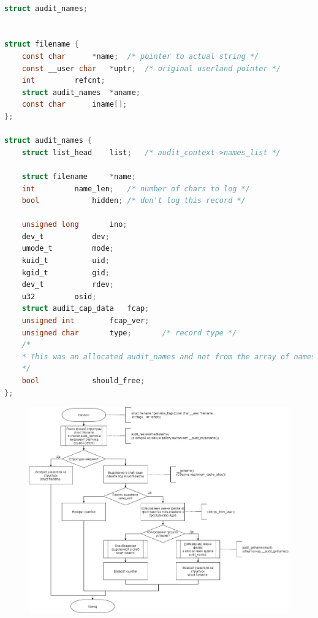 \documentclass[a4paper,14pt]{extreport}
\begin{document}
\begin{lstlisting}[language=c, caption=Структуры audit\_names и filename]
	
struct audit_names;


struct filename {
	const char		*name;	/* pointer to actual string */
	const __user char	*uptr;	/* original userland pointer */
	int			refcnt;
	struct audit_names	*aname;
	const char		iname[];
};

struct audit_names {
	struct list_head	list;	/* audit_context->names_list */
	
	struct filename		*name;
	int			name_len;	/* number of chars to log */
	bool			hidden;	/* don't log this record */
	
	unsigned long		ino;
	dev_t			dev;
	umode_t			mode;
	kuid_t			uid;
	kgid_t			gid;
	dev_t			rdev;
	u32			osid;
	struct audit_cap_data	fcap;
	unsigned int		fcap_ver;
	unsigned char		type;		/* record type */
	/*
	* This was an allocated audit_names and not from the array of names allocated in the task audit context.  * Thus this name should be freed on syscall exit.
	*/
	bool			should_free;
};

\end{lstlisting}






\begin{figure}[H]
	\centering
	\includegraphics[scale=0.44]{img/getname_flags.jpg}
	\label{fig:get_name_flags}
\end{figure}
\end{document}
